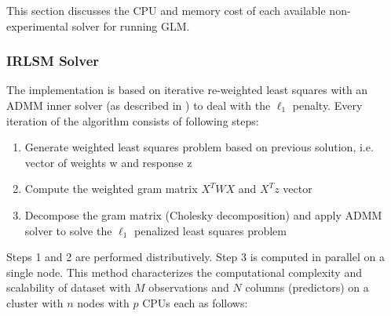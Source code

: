 This section discusses the CPU and memory cost of each available non-experimental solver for running GLM.

\subsubsection{IRLSM Solver}

The implementation is based on iterative re-weighted least squares with an ADMM inner solver (as described
in ) to deal with the  $\ell_1$ penalty. Every iteration of the algorithm consists of following steps:

\begin{enumerate} 
\item Generate weighted least squares problem based on previous solution, i.e. vector of weights w and response z 
\item Compute the weighted gram matrix $X^TWX$ and $X^Tz$ vector
\item Decompose the gram matrix (Cholesky decomposition) and apply ADMM solver to solve the  $\ell_1$ penalized least squares problem
\end{enumerate}

Steps 1 and 2 are performed distributively. Step 3 is computed in parallel on a single node. This method
characterizes the computational complexity and scalability of dataset with $M$ observations and $N$ columns (predictors)
on a cluster with $n$ nodes with $p$ CPUs each as follows:

\bigskip


